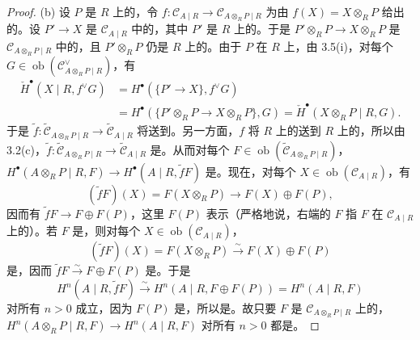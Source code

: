 \begin{proof}
(b) 设 $P$ 是 $R$ 上的，令 $f:\mathcal C_{A\mid R}\to\mathcal C_{A\otimes_R P\mid R}$ 为由 $f(X)=X\otimes_R P$ 给出的。设 $P'\to X$ 是 $\mathcal C_{A\mid R}$ 中的，其中 $P'$ 是 $R$ 上的。于是 $P'\otimes_R P\to X\otimes_R P$ 是 $\mathcal C_{A\otimes_R P\mid R}$ 中的，且 $P'\otimes_R P$ 仍是 $R$ 上的。由于 $P$ 在 $R$ 上，由 3.5(i)，对每个 $G\in\operatorname{ob}(\mathcal C_{A\otimes_R P\mid R}^{\vee})$，有
\[
\begin{aligned}
\check H^{\bullet}(X\mid R,f^{\vee}G)
&=H^{\bullet}(\{P'\to X\},f^{\vee}G)\\
&=H^{\bullet}(\{P'\otimes_R P\to X\otimes_R P\},G)
=\check H^{\bullet}(X\otimes_R P\mid R,G).
\end{aligned}
\]
于是 $\widetilde f:\widetilde{\mathcal C}_{A\otimes_R P\mid R}\to\widetilde{\mathcal C}_{A\mid R}$ 将送到。另一方面，$f$ 将 $R$ 上的送到 $R$ 上的，所以由 3.2(c)，$\widetilde f:\widetilde{\mathcal C}_{A\otimes_R P\mid R}\to\widetilde{\mathcal C}_{A\mid R}$ 是。从而对每个 $F\in\operatorname{ob}(\widetilde{\mathcal C}_{A\otimes_R P\mid R})$，$H^{\bullet}(A\otimes_R P\mid R,F)\to H^{\bullet}(A\mid R,\widetilde fF)$ 是。现在，对每个 $X\in\operatorname{ob}(\mathcal C_{A\mid R})$，有
\[(\widetilde fF)(X)=F(X\otimes_R P)\longrightarrow F(X)\oplus F(P),\]
因而有 $\widetilde fF\to F\oplus F(P)$，这里 $F(P)$ 表示（严格地说，右端的 $F$ 指 $F$ 在 $\mathcal C_{A\mid R}$ 上的）。若 $F$ 是，则对每个 $X\in\operatorname{ob}(\mathcal C_{A\mid R})$，
\[(\widetilde fF)(X)=F(X\otimes_R P)\xrightarrow{\sim}F(X)\oplus F(P)\]
是，因而 $\widetilde fF\xrightarrow{\sim}F\oplus F(P)$ 是。于是
\[H^n(A\mid R,\widetilde fF)\xrightarrow{\sim}H^n(A\mid R,F\oplus F(P))=H^n(A\mid R,F)\]
对所有 $n>0$ 成立，因为 $F(P)$ 是，所以是。故只要 $F$ 是 $\mathcal C_{A\otimes_R P\mid R}$ 上的，$H^n(A\otimes_R P\mid R,F)\to H^n(A\mid R,F)$ 对所有 $n>0$ 都是。


\end{proof}
